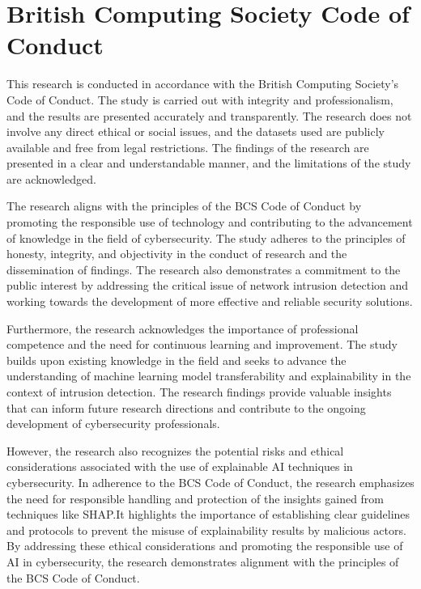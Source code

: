 \section{British Computing Society Code of Conduct}
This research is conducted in accordance with the British Computing Society's Code of Conduct. The study is carried out with integrity and professionalism, and the results are presented accurately and transparently. The research does not involve any direct ethical or social issues, and the datasets used are publicly available and free from legal restrictions. The findings of the research are presented in a clear and understandable manner, and the limitations of the study are acknowledged.

The research aligns with the principles of the BCS Code of Conduct by promoting the responsible use of technology and contributing to the advancement of knowledge in the field of cybersecurity. The study adheres to the principles of honesty, integrity, and objectivity in the conduct of research and the dissemination of findings. The research also demonstrates a commitment to the public interest by addressing the critical issue of network intrusion detection and working towards the development of more effective and reliable security solutions.

Furthermore, the research acknowledges the importance of professional competence and the need for continuous learning and improvement. The study builds upon existing knowledge in the field and seeks to advance the understanding of machine learning model transferability and explainability in the context of intrusion detection. The research findings provide valuable insights that can inform future research directions and contribute to the ongoing development of cybersecurity professionals.

However, the research also recognizes the potential risks and ethical considerations associated with the use of explainable AI techniques in cybersecurity. In adherence to the BCS Code of Conduct, the research emphasizes the need for responsible handling and protection of the insights gained from techniques like SHAP.\@ It highlights the importance of establishing clear guidelines and protocols to prevent the misuse of explainability results by malicious actors. By addressing these ethical considerations and promoting the responsible use of AI in cybersecurity, the research demonstrates alignment with the principles of the BCS Code of Conduct.